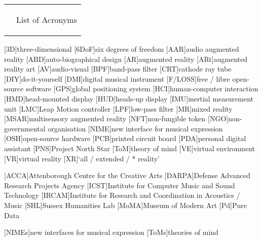 \newpage
{}
\vspace*{2cm}
\noindent\Vlines\hspace*{-2em}%
\begin{tabular}{@{}p{1cm} p{\textwidth-3cm}}%
  \relax
  &\Huge\bfseries\raggedright List of Acronyms
\end{tabular}
\vspace*{1cm}
\begin{SingleSpace}
	\begin{acronym}[F/LOSS]
		[3D]{three-dimensional}
		{six degrees of freedom}
		[AAR]{audio augmented reality}
		[ABD]{auto-biographical design}
		[AR]{augmented reality}
		[ARt]{augmented reality art}
		[AV]{audio-visual}
		[BPF]{band-pass filter}
		[CRT]{cathode ray tube}
		[DIY]{do-it-yourself}
		[DMI]{digital musical instrument}
		[F/LOSS]{free / libre open-source software}
		[GPS]{global positioning system}
		[HCI]{human-computer interaction}
		[HMD]{head-mounted display}
		[HUD]{heads-up display}
		[IMU]{inertial measurement unit}
		[LMC]{Leap Motion controller}
		[LPF]{low-pass filter}
		[MR]{mixed reality}
		{multisensory augmented reality}
		[NFT]{non-fungible token}
		[NGO]{non-governmental organisation}
		{new interface for musical expression}
		[OSH]{open-source hardware}
		[PCB]{printed circuit board}
		[PDA]{personal digital assistant}
		[PNS]{Project North Star}
		[ToM]{theory of mind}
		[VE]{virtual environment}
		[VR]{virtual reality}
		[XR]{`all / extended / * reality'}
		
		{Attenborough Centre for the Creative Arts}
		[DARPA]{Defense Advanced Research Projects Agency}
		{Institute for Computer Music and Sound Technology}
		[IRCAM]{Institute for Research and Coordination in Acoustics / Music}
		[SHL]{Sussex Humanities Lab}
		{Museum of Modern Art}
		[Pd]{Pure Data}

		[NIMEs]{new interfaces for musical expression}
		{theories of mind}

	\end{acronym}
\end{SingleSpace}